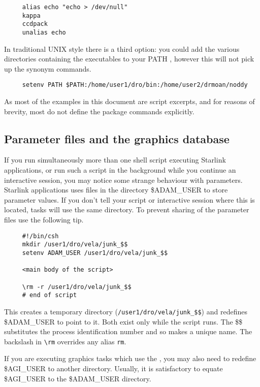 \small
\begin{verbatim}
     alias echo "echo > /dev/null"
     kappa
     ccdpack
     unalias echo
\end{verbatim}
\normalsize
In traditional UNIX style there is a third option: you could add the
various directories containing the executables to your PATH
, however this will not
pick up the synonym commands.

\small
\begin{verbatim}
     setenv PATH $PATH:/home/user1/dro/bin:/home/user2/drmoan/noddy
\end{verbatim}
\normalsize
As most of the examples in this document are script excerpts, and for
reasons of brevity, most do not define the package commands explicitly.

\newpage
\subsection{Parameter files and the
graphics database}\label{sc4_se_multi_param}

If you run simultaneously more than one shell script executing
Starlink applications, or run such a script in the background while
you continue an interactive session, you may notice some strange
behaviour with parameters.   Starlink applications uses files in
the directory \$ADAM\_USER to store parameter values.  If you don't
tell your script or interactive session where this is located,
tasks will use the same directory.  To prevent sharing of the
parameter files use the following tip.

\begin{verbatim}
     #!/bin/csh
     mkdir /user1/dro/vela/junk_$$
     setenv ADAM_USER /user1/dro/vela/junk_$$

     <main body of the script>

     \rm -r /user1/dro/vela/junk_$$
     # end of script
\end{verbatim}
This creates a temporary directory ({\tt /user1/dro/vela/junk\_\$\$})
and redefines \$ADAM\_USER to point to it.  Both exist only while the
script runs.  The \$\$ substitutes the process identification number
and so makes a unique name.  The backslash in \verb+\rm+ overrides
any alias {\tt rm}.

If you are executing graphics tasks which use the , you may also need to redefine \$AGI\_USER
to another directory.  Usually, it is satisfactory to equate \$AGI\_USER
to the \$ADAM\_USER directory.

